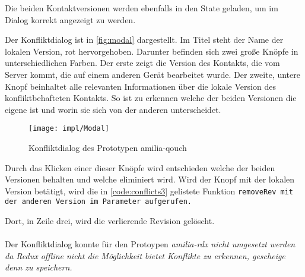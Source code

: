 Die beiden Kontaktversionen werden ebenfalls in den State geladen, um im Dialog korrekt angezeigt zu werden.
%
\begin{center}
  
\end{center}
%
Der Konfliktdialog ist in \autoref{fig:modal} dargestellt.
Im Titel steht der Name der lokalen Version, rot hervorgehoben.
Darunter befinden sich zwei große Knöpfe in unterschiedlichen Farben.
Der erste zeigt die Version des Kontakts, die vom Server kommt, die auf einem anderen Gerät bearbeitet wurde.
Der zweite, untere Knopf beinhaltet alle relevanten Informationen über die lokale Version des konfliktbehafteten Kontakts.
So ist zu erkennen welche der beiden Versionen die eigene ist und worin sie sich von der anderen unterscheidet.
%
\begin{figure}[H]
  \centering
  \texttt{[image: impl/Modal]}
  \grayRule
  \caption{Konfliktdialog des Prototypen amilia-qouch}
  \label{fig:modal}
\end{figure}
%
Durch das Klicken einer dieser Knöpfe wird entschieden welche der beiden Versionen behalten und welche eliminiert wird.
Wird der Knopf mit der lokalen Version betätigt, wird die in \autoref{code:conflicts3} gelistete Funktion \tt{removeRev} mit der anderen Version im Parameter aufgerufen.
%
\begin{center}
  
\end{center}
%
Dort, in Zeile drei, wird die verlierende Revision gelöscht.\\\\
%
%
Der Konfliktdialog konnte für den Protoypen \it{amilia-rdx} nicht umgesetzt werden da Redux offline nicht die Möglichkeit bietet Konflikte zu erkennen, gescheige denn zu speichern.